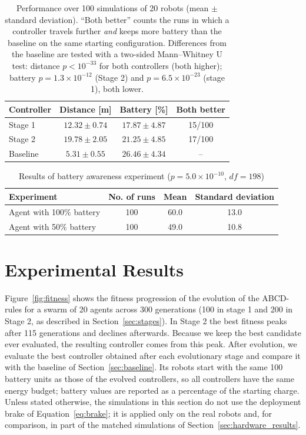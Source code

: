 \documentclass[runningheads]{llncs}
\begin{document}
\begin{table}[t]
\centering
\caption{Performance over 100 simulations of 20 robots (mean $\pm$ standard deviation). ``Both better'' counts the runs in which a controller travels further \emph{and} keeps more battery than the baseline on the same starting configuration. Differences from the baseline are tested with a two-sided Mann--Whitney U test: distance $p < 10^{-33}$ for both controllers (both higher); battery $p = 1.3\times10^{-12}$ (Stage 2) and $p = 6.5\times10^{-23}$ (stage 1), both lower.}
\label{tab:results_main}
{
\begin{tabular}{lccc}
\toprule
\textbf{Controller} & \textbf{Distance [m]} & \textbf{Battery [\%]} & \textbf{Both better} \\
\midrule
Stage 1 & $12.32 \pm 0.74$ & $17.87 \pm 4.87$ & 15/100 \\
Stage 2 & $19.78 \pm 2.05$ & $21.25 \pm 4.85$ & 17/100 \\
Baseline & $5.31 \pm 0.55$ & $26.46 \pm 4.34$ & -- \\
\bottomrule
\end{tabular}}
\end{table}


\begin{table}[t]
\centering
\caption{Results of battery awareness experiment ($p=5.0\times10^{-10}$, $df=198$)}
\begin{tabular}{lccc}
\toprule
\textbf{Experiment} & \textbf{No. of runs} & \textbf{Mean} & \textbf{Standard deviation} \\
\midrule
Agent with 100\% battery & 100 & 60.0 & 13.0 \\
Agent with 50\% battery & 100 & 49.0 & 10.8 \\
\bottomrule
\end{tabular}
\label{tab:results_batt_aware}
\end{table}


\section{Experimental Results}
\label{sec:Exp:Results}

Figure~\ref{fig:fitness} shows the fitness progression of the evolution of the ABCD-rules for a swarm of 20 agents across 300 generations (100 in stage 1 and 200 in Stage 2, as described in Section~\ref{sec:stages}). In Stage 2 the best fitness peaks after 115 generations and declines afterwards. Because we keep the best candidate ever evaluated, the resulting controller comes from this peak. After evolution, we evaluate the best controller obtained after each evolutionary stage and compare it with the baseline of Section~\ref{sec:baseline}. Its robots start with the same 100 battery units as those of the evolved controllers, so all controllers have the same energy budget; battery values are reported as a percentage of the starting charge. Unless stated otherwise, the simulations in this section do not use the deployment brake of Equation~\ref{eq:brake}; it is applied only on the real robots and, for comparison, in part of the matched simulations of Section~\ref{sec:hardware_results}.
\end{document}
